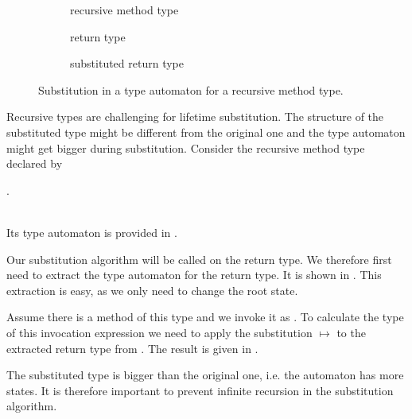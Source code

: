 \begin{figure}[t]
\begin{subfigure}[b]{0.41\textwidth}%
%
\caption{recursive method type}%
\label{figure:recursive-method-automaton}%
\end{subfigure}%
\begin{subfigure}[b]{0.25\textwidth}%
%
\caption{return type}%
\label{figure:recursive-method-automaton-return}%
\end{subfigure}%
\begin{subfigure}[b]{0.34\textwidth}%
%
\caption{substituted return type}%
\label{figure:recursive-method-automaton-substituted}%
\end{subfigure}%
\caption{Substitution in a type automaton for a recursive method type.}
\end{figure}

Recursive types are challenging for lifetime substitution.
The structure of the substituted type might be different from the original one and the type automaton might get bigger during substitution.
Consider the recursive method type declared by\\
\centerline{.}\\
Its type automaton is provided in .

Our substitution algorithm will be called on the return type.
We therefore first need to extract the type automaton for the return type.
It is shown in .
This extraction is easy, as we only need to change the root state.

\begin{sloppypar}
Assume there is a method  of this type  and we invoke it as .
To calculate the type of this invocation expression we need to apply the substitution  $\mapsto$  to the extracted return type from .
The result is given in .
\end{sloppypar}

The substituted type is bigger than the original one, i.e. the automaton has more states.
It is therefore important to prevent infinite recursion in the substitution algorithm.


